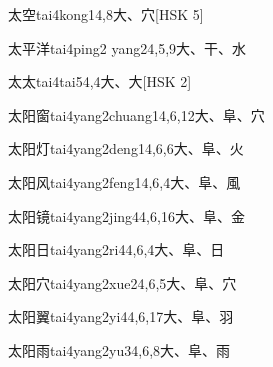 \begin{entry}{太空}{tai4kong1}{4,8}{⼤、⽳}[HSK 5]
\end{entry}

\begin{entry}{太平洋}{tai4ping2 yang2}{4,5,9}{⼤、⼲、⽔}
\end{entry}

\begin{entry}{太太}{tai4tai5}{4,4}{⼤、⼤}[HSK 2]
\end{entry}

\begin{entry}{太阳窗}{tai4yang2chuang1}{4,6,12}{⼤、⾩、⽳}
\end{entry}

\begin{entry}{太阳灯}{tai4yang2deng1}{4,6,6}{⼤、⾩、⽕}
\end{entry}

\begin{entry}{太阳风}{tai4yang2feng1}{4,6,4}{⼤、⾩、⾵}
\end{entry}

\begin{entry}{太阳镜}{tai4yang2jing4}{4,6,16}{⼤、⾩、⾦}
\end{entry}

\begin{entry}{太阳日}{tai4yang2ri4}{4,6,4}{⼤、⾩、⽇}
\end{entry}

\begin{entry}{太阳穴}{tai4yang2xue2}{4,6,5}{⼤、⾩、⽳}
\end{entry}

\begin{entry}{太阳翼}{tai4yang2yi4}{4,6,17}{⼤、⾩、⽻}
\end{entry}

\begin{entry}{太阳雨}{tai4yang2yu3}{4,6,8}{⼤、⾩、⾬}
\end{entry}

